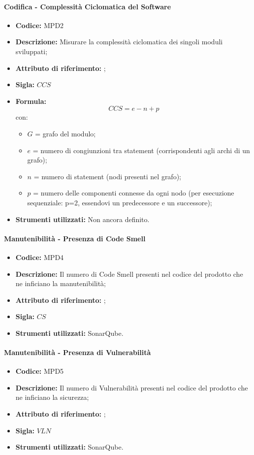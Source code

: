 \paragraph{Codifica - Complessità Ciclomatica del Software} 
    \begin{itemize}
    \item \textbf{Codice:} MPD2
    \item \textbf{Descrizione:} Misurare la complessità ciclomatica dei singoli moduli sviluppati;
    \item \textbf{Attributo di riferimento:} ;
    \item \textbf{Sigla:} $CCS$
    \item \textbf{Formula:} $$CCS = e - n + p$$
    con:
    \begin{itemize}
        \item $G$ = grafo del modulo;
        \item $e$ = numero di congiunzioni tra statement (corrispondenti agli archi di un grafo);
        \item $n$ = numero di statement (nodi presenti nel grafo);
        \item $p$ = numero delle componenti connesse da ogni nodo (per esecuzione sequenziale: p=2, essendovi un predecessore e un successore);
    \end{itemize}
    \item \textbf{Strumenti utilizzati:} Non ancora definito.
\end{itemize}

\paragraph{Manutenibilità - Presenza di Code Smell} 
\begin{itemize}
    \item \textbf{Codice:} MPD4
    \item \textbf{Descrizione:} Il numero di Code Smell presenti nel codice del prodotto che ne inficiano la manutenibilità;
    \item \textbf{Attributo di riferimento:} ;
    \item \textbf{Sigla:} $CS$
    \item \textbf{Strumenti utilizzati:} SonarQube.
\end{itemize}

\paragraph{Manutenibilità - Presenza di Vulnerabilità} 
\begin{itemize}
    \item \textbf{Codice:} MPD5
    \item \textbf{Descrizione:} Il numero di Vulnerabilità presenti nel codice del prodotto che ne inficiano la sicurezza;
    \item \textbf{Attributo di riferimento:} ;
    \item \textbf{Sigla:} $VLN$
    \item \textbf{Strumenti utilizzati:} SonarQube.
\end{itemize}

